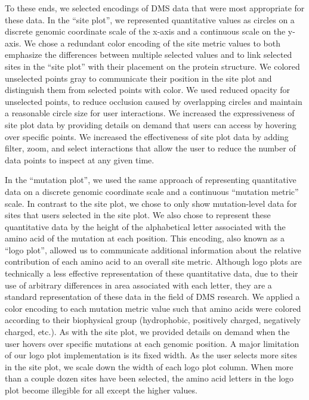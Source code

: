 To these ends, we selected encodings of DMS data that were most appropriate for these data.
In the ``site plot'', we represented quantitative values as circles on a discrete genomic coordinate scale of the x-axis and a continuous scale on the y-axis.
We chose a redundant color encoding of the site metric values to both emphasize the differences between multiple selected values and to link selected sites in the ``site plot'' with their placement on the protein structure.
We colored unselected points gray to communicate their position in the site plot and distinguish them from selected points with color.
We used reduced opacity for unselected points, to reduce occlusion caused by overlapping circles and maintain a reasonable circle size for user interactions.
We increased the expressiveness of site plot data by providing details on demand that users can access by hovering over specific points.
We increased the effectiveness of site plot data by adding filter, zoom, and select interactions that allow the user to reduce the number of data points to inspect at any given time.

In the ``mutation plot'', we used the same approach of representing quantitative data on a discrete genomic coordinate scale and a continuous ``mutation metric'' scale.
In contrast to the site plot, we chose to only show mutation-level data for sites that users selected in the site plot.
We also chose to represent these quantitative data by the height of the alphabetical letter associated with the amino acid of the mutation at each position.
This encoding, also known as a ``logo plot'', allowed us to communicate additional information about the relative contribution of each amino acid to an overall site metric.
Although logo plots are technically a less effective representation of these quantitative data, due to their use of arbitrary differences in area associated with each letter, they are a standard representation of these data in the field of DMS research.
We applied a color encoding to each mutation metric value such that amino acids were colored according to their biophysical group (hydrophobic, positively charged, negatively charged, etc.).
As with the site plot, we provided details on demand when the user hovers over specific mutations at each genomic position.
A major limitation of our logo plot implementation is its fixed width.
As the user selects more sites in the site plot, we scale down the width of each logo plot column.
When more than a couple dozen sites have been selected, the amino acid letters in the logo plot become illegible for all except the higher values.

